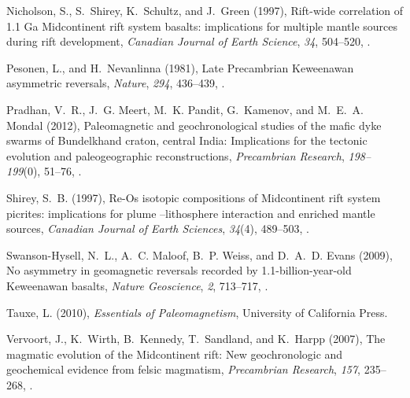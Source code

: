 \documentclass[draft,gc]{AGUTeX}
\begin{document}
\begin{article}
\begin{thebibliography}{24}
Nicholson, S., S.~Shirey, K.~Schultz, and J.~Green (1997), Rift-wide
  correlation of 1.1 {G}a {M}idcontinent rift system basalts: implications for
  multiple mantle sources during rift development, \textit{Canadian Journal of
  Earth Science}, \textit{34}, 504--520, .

Pesonen, L., and H.~Nevanlinna (1981), Late {P}recambrian {K}eweenawan
  asymmetric reversals, \textit{Nature}, \textit{294}, 436--439,
  .

Pradhan, V.~R., J.~G. Meert, M.~K. Pandit, G.~Kamenov, and M.~E.~A. Mondal
  (2012), Paleomagnetic and geochronological studies of the mafic dyke swarms
  of {Bundelkhand craton, central India}: Implications for the tectonic
  evolution and paleogeographic reconstructions, \textit{Precambrian Research},
  \textit{198--199}(0), 51--76, .

Shirey, S.~B. (1997), {Re-Os isotopic compositions of Midcontinent rift system
  picrites: implications for plume --lithosphere interaction and enriched
  mantle sources}, \textit{Canadian Journal of Earth Sciences}, \textit{34}(4),
  489--503, .

Swanson-Hysell, N.~L., A.~C. Maloof, B.~P. Weiss, and D.~A.~D. Evans (2009), No
  asymmetry in geomagnetic reversals recorded by 1.1-billion-year-old
  {K}eweenawan basalts, \textit{Nature Geoscience}, \textit{2}, 713--717,
  .

{Tauxe}, L. (2010), \textit{Essentials of Paleomagnetism}, University of
  California Press.

Vervoort, J., K.~Wirth, B.~Kennedy, T.~Sandland, and K.~Harpp (2007), The
  magmatic evolution of the {M}idcontinent rift: New geochronologic and
  geochemical evidence from felsic magmatism, \textit{Precambrian Research},
  \textit{157}, 235--268, .


\end{thebibliography}
\end{article}
\end{document}

